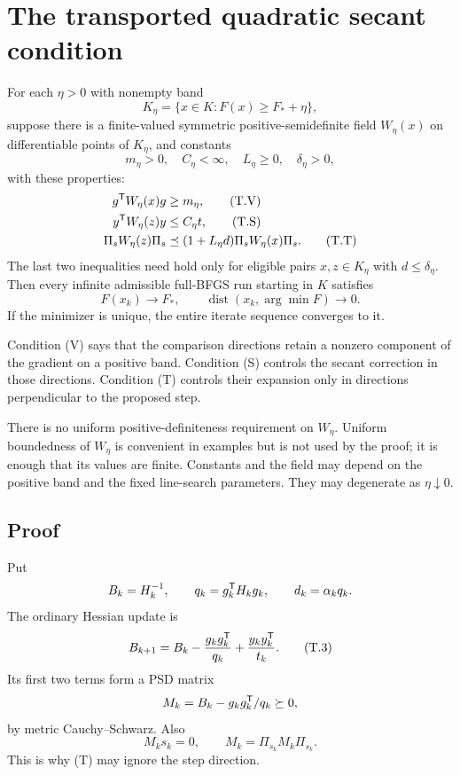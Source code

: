 \section{The transported quadratic secant condition}
\begin{theorem}
For each $\eta>0$ with nonempty band
\[
 K_\eta=\{x\in K:F(x)\ge F_*+\eta\},
\]
suppose there is a finite-valued symmetric positive-semidefinite field $W_\eta(x)$ on differentiable points of $K_\eta$, and constants
\[
 m_\eta>0,\quad C_\eta<\infty,\quad L_\eta\ge0,\quad \delta_\eta>0,
\]
with these properties:
\begin{align}
 g^{\mathsf T} W_\eta(x)g&\ge m_\eta, \tag{T.V}\\
 y^{\mathsf T} W_\eta(z)y&\le C_\eta t, \tag{T.S}\\
 \Pi_s W_\eta(z)\Pi_s&\preceq
 (1+L_\eta d)\Pi_s W_\eta(x)\Pi_s. \tag{T.T}
\end{align}
The last two inequalities need hold only for eligible pairs $x,z\in K_\eta$ with $d\le\delta_\eta$. Then every infinite admissible full-BFGS run starting in $K$ satisfies
\[
 F(x_k)\to F_*,\qquad \operatorname{dist}(x_k,\arg\min F)\to0.
\]
If the minimizer is unique, the entire iterate sequence converges to it.
\end{theorem}
Condition (V) says that the comparison directions retain a nonzero component of the gradient on a positive band. Condition (S) controls the secant correction in those directions. Condition (T) controls their expansion only in directions perpendicular to the proposed step.

There is no uniform positive-definiteness requirement on $W_\eta$. Uniform boundedness of $W_\eta$ is convenient in examples but is not used by the proof; it is enough that its values are finite. Constants and the field may depend on the positive band and the fixed line-search parameters. They may degenerate as $\eta\downarrow0$.

\subsection{Proof}
Put
\[
 B_k=H_k^{-1},\qquad q_k=g_k^{\mathsf T} H_kg_k,\qquad
 d_k=\alpha_kq_k.
\]
The ordinary Hessian update is
\begin{equation}
 B_{k+1}=B_k-\frac{g_kg_k^{\mathsf T}}{q_k}+\frac{y_ky_k^{\mathsf T}}{t_k}. \tag{T.3}
\end{equation}
Its first two terms form a PSD matrix
\[
 M_k=B_k-g_kg_k^{\mathsf T}/q_k\succeq0,
\]
by metric Cauchy--Schwarz. Also
\begin{equation}
 M_ks_k=0,\qquad M_k=\Pi_{s_k}M_k\Pi_{s_k}. \tag{T.4}
\end{equation}
This is why (T) may ignore the step direction.


